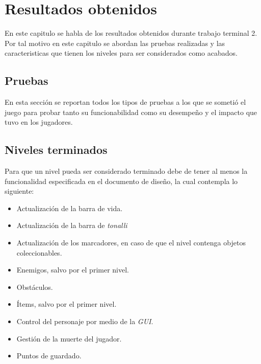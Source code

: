 \chapter{Resultados obtenidos}
En este capitulo se habla de los resultados obtenidos durante trabajo terminal 2. 
Por tal motivo en este capitulo se abordan las pruebas realizadas y las 
caracteristicas que tienen los niveles para ser considerados como acabados.

\section{Pruebas}
En esta sección se reportan todos los tipos de pruebas a los que se sometió el 
juego para probar tanto su funcionabilidad como su desempeño y el impacto que 
tuvo en los jugadores.









%

\section{Niveles terminados}
Para que un nivel pueda ser considerado terminado debe de tener al menos la 
funcionalidad especificada en el documento de diseño, la cual contempla lo 
siguiente: 
\begin{itemize}
        \item Actualización de la barra de vida.
        \item Actualización de la barra de \textit{tonalli}
        \item Actualización de los marcadores, en caso de que el nivel contenga objetos 
        coleccionables.
        \item Enemigos, salvo por el primer nivel.
        \item Obstáculos.
        \item Ítems, salvo por el primer nivel.
        \item Control del personaje por medio de la \textit{GUI}.
        \item Gestión de la muerte del jugador.
        \item Puntos de guardado.
\end{itemize} 

